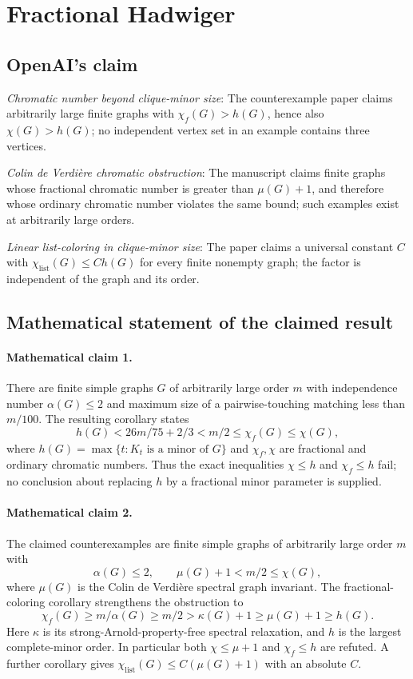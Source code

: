 \documentclass[11pt]{article}
\begin{document}
\section*{Fractional Hadwiger}

\subsection{OpenAI's claim}
\textit{Chromatic number beyond clique-minor size}: The counterexample paper claims arbitrarily large finite graphs with $\chi_f(G)>h(G)$, hence also $\chi(G)>h(G)$; no independent vertex set in an example contains three vertices.

\textit{Colin de Verdière chromatic obstruction}: The manuscript claims finite graphs whose fractional chromatic number is greater than $\mu(G)+1$, and therefore whose ordinary chromatic number violates the same bound; such examples exist at arbitrarily large orders.

\textit{Linear list-coloring in clique-minor size}: The paper claims a universal constant $C$ with $\chi_{\mathrm{list}}(G)\le C h(G)$ for every finite nonempty graph; the factor is independent of the graph and its order.

\subsection{Mathematical statement of the claimed result}
\paragraph{Mathematical claim 1.} There are finite simple graphs $G$ of arbitrarily large order $m$ with independence number $\alpha(G)\le2$ and maximum size of a pairwise-touching matching less than $m/100$. The resulting corollary states \[h(G)<26m/75+2/3<m/2\le\chi_f(G)\le\chi(G),\] where $h(G)=\max\{t:K_t\text{ is a minor of }G\}$ and $\chi_f,\chi$ are fractional and ordinary chromatic numbers. Thus the exact inequalities $\chi\le h$ and $\chi_f\le h$ fail; no conclusion about replacing $h$ by a fractional minor parameter is supplied.

\paragraph{Mathematical claim 2.} The claimed counterexamples are finite simple graphs of arbitrarily large order $m$ with \[\alpha(G)\le2,\qquad\mu(G)+1<m/2\le\chi(G),\] where $\mu(G)$ is the Colin de Verdi\`ere spectral graph invariant. The fractional-coloring corollary strengthens the obstruction to \[\chi_f(G)\ge m/\alpha(G)\ge m/2>\kappa(G)+1\ge\mu(G)+1\ge h(G).\] Here $\kappa$ is its strong-Arnold-property-free spectral relaxation, and $h$ is the largest complete-minor order. In particular both $\chi\le\mu+1$ and $\chi_f\le h$ are refuted. A further corollary gives $\chi_{\mathrm{list}}(G)\le C(\mu(G)+1)$ with an absolute $C$.
\end{document}
